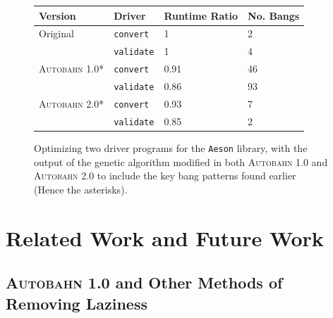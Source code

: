 \documentclass[format=sigplan, review=true, 9pt]{acmart}
\newcommand{\scaption}[1]{\caption{#1}}
\newcommand{\Ao}[0]{\textsc{Autobahn 1.0}}
\newcommand{\At}[0]{\textsc{Autobahn 2.0}}
\newcommand{\preopt}[0]{pre-search}
\begin{document}
{%



\begin{figure}
\begin{tabular}{p{2.5cm}p{1.5cm}p{1.5cm}p{1.5cm}}
\hline
Version   & Driver & Runtime Ratio & No. Bangs\\
\hline
Original      & \texttt{convert}   & 1     &  2\\
              & \texttt{validate}  & 1     &  4\\
\Ao{}*        & \texttt{convert}   & 0.91  & 46\\
              & \texttt{validate}  & 0.86  & 93\\
\At{}*        & \texttt{convert}   & 0.93  &  7\\
              & \texttt{validate}  & 0.85  &  2\\
\hline
\end{tabular}
\scaption{Optimizing two driver programs for
the \texttt{Aeson} library, with the output of the genetic algorithm 
modified in both \Ao{} and \At{} to include the key bang patterns
found earlier~\cite{autobahn-wang} (Hence the asterisks).} 
\label{fig:aeson}
\end{figure}
}

\section{Related Work and Future Work}

\subsection{\Ao{} and Other Methods of Removing Laziness}
\end{document}
